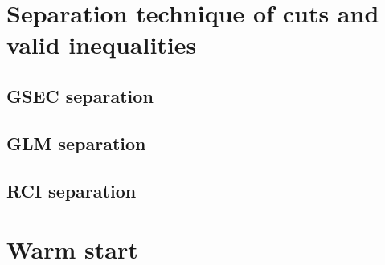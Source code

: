 \section{Separation technique of cuts and valid inequalities}

\subsection{GSEC separation}

\subsection{GLM separation}

\subsection{RCI separation}

\section{Warm start}
